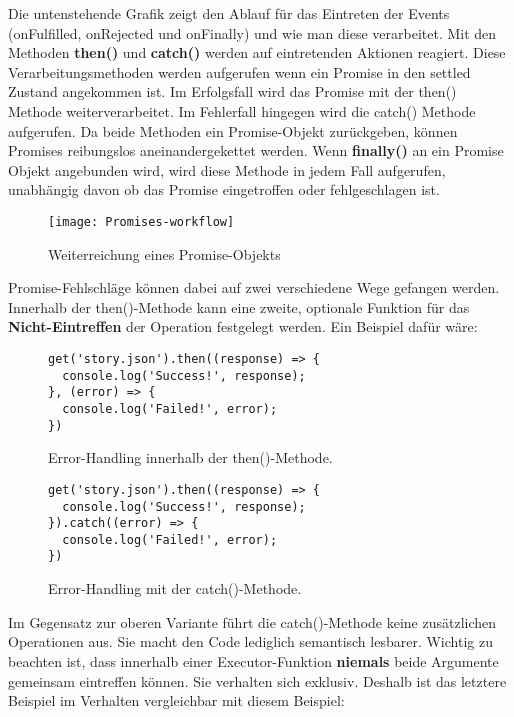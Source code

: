 \noindent
Die untenstehende Grafik zeigt den Ablauf für das Eintreten der Events (onFulfilled, onRejected und onFinally) und wie man diese verarbeitet. Mit den Methoden \textbf{then()} und \textbf{catch()} werden auf eintretenden Aktionen reagiert. Diese Verarbeitungsmethoden werden aufgerufen wenn ein Promise in den settled Zustand angekommen ist. Im Erfolgsfall wird das Promise mit der then() Methode weiterverarbeitet. Im Fehlerfall hingegen wird die catch() Methode aufgerufen. Da beide Methoden ein Promise-Objekt zurückgeben, können Promises reibungslos aneinandergekettet werden. Wenn \textbf{finally()} an ein Promise Objekt angebunden wird, wird diese Methode in jedem Fall aufgerufen, unabhängig davon ob das Promise eingetroffen oder fehlgeschlagen ist.


\begin{figure}[H]
\texttt{[image: Promises-workflow]}
\caption{Weiterreichung eines Promise-Objekts \cite{promise-executor}}
\end{figure}

\noindent
Promise-Fehlschläge können dabei auf zwei verschiedene Wege gefangen werden. Innerhalb der then()-Methode kann eine zweite, optionale Funktion für das \textbf{Nicht-Eintreffen} der Operation festgelegt werden. Ein Beispiel dafür wäre:

\begin{figure}[H]
\begin{lstlisting}[basicstyle=\small]
get('story.json').then((response) => {
  console.log('Success!', response);
}, (error) => {
  console.log('Failed!', error);
})
\end{lstlisting}
\caption{Error-Handling innerhalb der then()-Methode. \cite{callback-vs-promises}}
\end{figure}

\begin{figure}[H]
\begin{lstlisting}[basicstyle=\small]
get('story.json').then((response) => {
  console.log('Success!', response);
}).catch((error) => {
  console.log('Failed!', error);
})
\end{lstlisting}
\caption{Error-Handling mit der catch()-Methode. \cite{callback-vs-promises}}
\end{figure}

\noindent
Im Gegensatz zur oberen Variante führt die catch()-Methode keine zusätzlichen Operationen aus. Sie macht den Code lediglich semantisch lesbarer. Wichtig zu beachten ist, dass innerhalb einer Executor-Funktion \textbf{niemals} beide Argumente gemeinsam eintreffen können. Sie verhalten sich exklusiv. Deshalb ist das letztere Beispiel im Verhalten vergleichbar mit diesem Beispiel:

